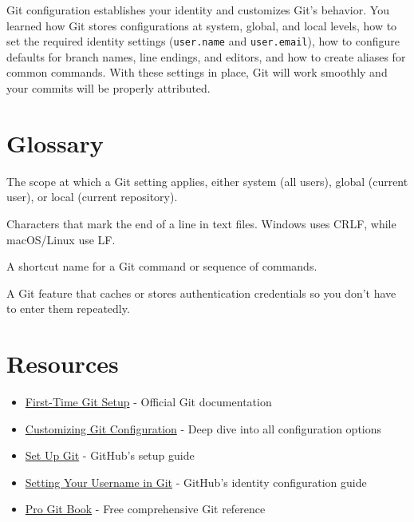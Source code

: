 \documentclass[
  letterpaper,
  DIV=11,
  numbers=noendperiod]{scrreprt}
\providecommand{\tightlist}{%
  \setlength{\itemsep}{0pt}\setlength{\parskip}{0pt}}
\begin{document}
Git configuration establishes your identity and customizes Git's
behavior. You learned how Git stores configurations at system, global,
and local levels, how to set the required identity settings
(\texttt{user.name} and \texttt{user.email}), how to configure defaults
for branch names, line endings, and editors, and how to create aliases
for common commands. With these settings in place, Git will work
smoothly and your commits will be properly attributed.

\section{Glossary}\label{glossary-10}

\begin{description}
\tightlist
\item[\textbf{Configuration Level}]
The scope at which a Git setting applies, either system (all users),
global (current user), or local (current repository).
\item[\textbf{Line Endings}]
Characters that mark the end of a line in text files. Windows uses CRLF,
while macOS/Linux use LF.
\item[\textbf{Alias}]
A shortcut name for a Git command or sequence of commands.
\item[\textbf{Credential Helper}]
A Git feature that caches or stores authentication credentials so you
don't have to enter them repeatedly.
\end{description}

\section{Resources}\label{resources-2}

\begin{itemize}
\tightlist
\item
  \href{https://git-scm.com/book/en/v2/Getting-Started-First-Time-Git-Setup}{First-Time
  Git Setup} - Official Git documentation
\item
  \href{https://git-scm.com/book/en/v2/Customizing-Git-Git-Configuration}{Customizing
  Git Configuration} - Deep dive into all configuration options
\item
  \href{https://docs.github.com/en/get-started/git-basics/set-up-git}{Set
  Up Git} - GitHub's setup guide
\item
  \href{https://docs.github.com/en/get-started/git-basics/setting-your-username-in-git}{Setting
  Your Username in Git} - GitHub's identity configuration guide
\item
  \href{https://git-scm.com/book/en/v2}{Pro Git Book} - Free
  comprehensive Git reference
\end{itemize}
\end{document}
